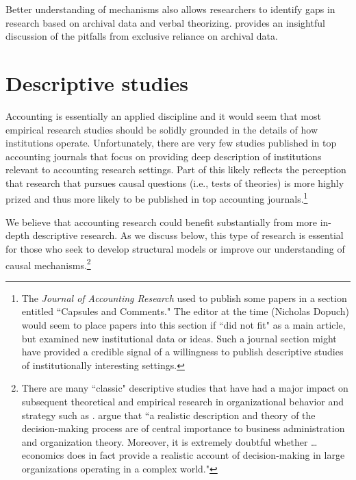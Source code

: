 \documentclass[11pt,reqno,titlepage]{amsart}
\begin{document}
\begin{doublespace}
Better understanding of mechanisms also allows researchers to identify gaps in research based on archival data and verbal theorizing.
\cite{Soltes:2014gr} provides an insightful discussion of the pitfalls from exclusive reliance on archival data. 




\section{Descriptive studies} \label{sec:desc}

Accounting is essentially an applied discipline and it would seem that most empirical research studies should be solidly grounded in the details of how institutions operate.
Unfortunately, there are very few studies published in top accounting journals that focus on providing deep description of institutions relevant to accounting research settings.
Part of this likely reflects the perception that research that pursues causal questions (i.e., tests of theories) is more highly prized and thus more likely to be published in top accounting journals.\footnote{
The \emph{Journal of Accounting Research} used to publish some papers in a section entitled ``Capsules and Comments."
The editor at the time (Nicholas Dopuch) would seem to place papers into this section if ``did not fit" as a main article, but examined new institutional data or ideas. 
Such a journal section might have provided a credible signal of a willingness to publish descriptive studies of institutionally interesting settings.}

We believe that accounting research could benefit substantially from more in-depth descriptive research.
As we discuss below, this type of research is essential for those who seek to develop structural models or improve our understanding of causal mechanisms.\footnote{
There are many ``classic" descriptive studies that have had a major impact on subsequent theoretical and empirical research in organizational behavior and strategy such as \citep{Cyert:1956fd,Bower:1986vd,Mintzberg1973nature}.
\citet{Cyert:1956fd} argue that ``a realistic description and theory of the decision-making process are of central importance to business administration and organization theory. Moreover, it is extremely doubtful whether \dots economics does in fact provide a realistic account of decision-making in large organizations operating in a complex world."}


\end{doublespace}
\end{document}

